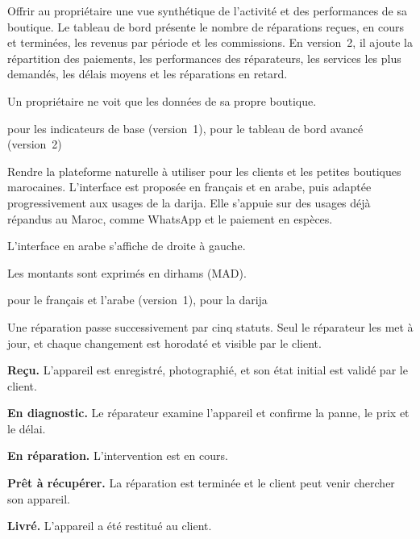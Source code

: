   {Offrir au propriétaire une vue synthétique de l’activité et des performances de sa boutique.}
  {Le tableau de bord présente le nombre de réparations reçues, en cours et terminées, les revenus par période et les commissions. En version~2, il ajoute la répartition des paiements, les performances des réparateurs, les services les plus demandés, les délais moyens et les réparations en retard.}
  {\begin{cdccellitems}
    \item Un propriétaire ne voit que les données de sa propre boutique.
  \end{cdccellitems}}
  {\prioMust{} pour les indicateurs de base (version~1), \prioShould{} pour le tableau de bord avancé (version~2)}

  {Rendre la plateforme naturelle à utiliser pour les clients et les petites boutiques marocaines.}
  {L’interface est proposée en français et en arabe, puis adaptée progressivement aux usages de la darija. Elle s’appuie sur des usages déjà répandus au Maroc, comme WhatsApp et le paiement en espèces.}
  {\begin{cdccellitems}
    \item L’interface en arabe s’affiche de droite à gauche.
    \item Les montants sont exprimés en dirhams (MAD).
  \end{cdccellitems}}
  {\prioMust{} pour le français et l’arabe (version~1), \prioCould{} pour la darija}

\label{sec:cycles}


Une réparation passe successivement par cinq statuts. Seul le réparateur les met à jour, et chaque changement est horodaté et visible par le client.

\begin{cdcetapes}
  \item \textbf{Reçu.} L’appareil est enregistré, photographié, et son état initial est validé par le client.
  \item \textbf{En diagnostic.} Le réparateur examine l’appareil et confirme la panne, le prix et le délai.
  \item \textbf{En réparation.} L’intervention est en cours.
  \item \textbf{Prêt à récupérer.} La réparation est terminée et le client peut venir chercher son appareil.
  \item \textbf{Livré.} L’appareil a été restitué au client.
\end{cdcetapes}

